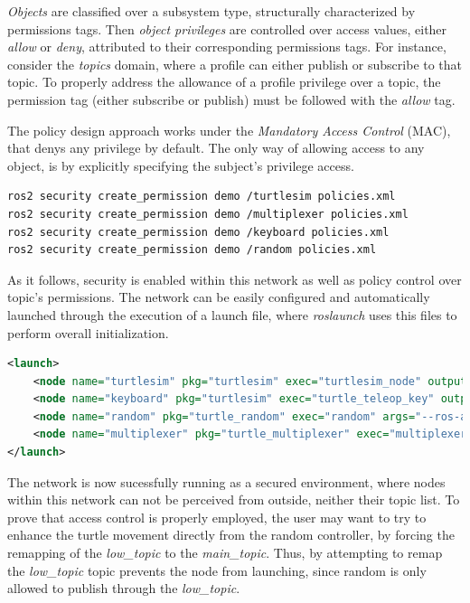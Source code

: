 \textit{Objects} are classified over a subsystem type, structurally characterized by permissions tags. Then \textit{object privileges} are controlled over access values, either \textit{allow} or \textit{deny}, attributed to their corresponding permissions tags. For instance, consider the \textit{topics} domain, where a profile can either publish or subscribe to that topic. To properly address the allowance of a profile privilege over a topic, the permission tag (either subscribe or publish) must be followed with the \textit{allow} tag.

The policy design approach works under the \textit{Mandatory Access Control} (MAC), that denys any privilege by default. The only way of allowing access to any object, is by explicitly specifying the subject's privilege access. 

\begin{lstlisting}[title={Setting permissions into each enclave.}]
ros2 security create_permission demo /turtlesim policies.xml
ros2 security create_permission demo /multiplexer policies.xml
ros2 security create_permission demo /keyboard policies.xml
ros2 security create_permission demo /random policies.xml
\end{lstlisting}

As it follows, security is enabled within this network as well as policy control over topic's permissions. The network can be easily configured and automatically launched through the execution of a launch file, where \textit{roslaunch} uses this files to perform overall initialization.

\begin{lstlisting}[title={\texttt{TurtleSim} launch file. Note that topic remap is used to properly address the transmission of movement commands from both publishers.}, language=xml]
<launch>
    <node name="turtlesim" pkg="turtlesim" exec="turtlesim_node" output="screen" args="--ros-args --enclave /turtlesim -r /turtle1/cmd_vel:=/main_topic" />
    <node name="keyboard" pkg="turtlesim" exec="turtle_teleop_key" output="screen" args="--ros-args --enclave /keyboard -r /turtle1/cmd_vel:=/high_topic" />
    <node name="random" pkg="turtle_random" exec="random" args="--ros-args --enclave /random" />
    <node name="multiplexer" pkg="turtle_multiplexer" exec="multiplexer" args="--ros-args --enclave /multiplexer" />
</launch>
\end{lstlisting}

The network is now sucessfully running as a secured environment, where nodes within this network can not be perceived from outside, neither their topic list. To prove that access control is properly employed, the user may want to try to enhance the turtle movement directly from the random controller, by forcing the remapping of the \textit{low\_topic} to the \textit{main\_topic}.  Thus, by attempting to remap the \textit{low\_topic} topic prevents the node from launching, since random is only allowed to publish through the \textit{low\_topic}. 

